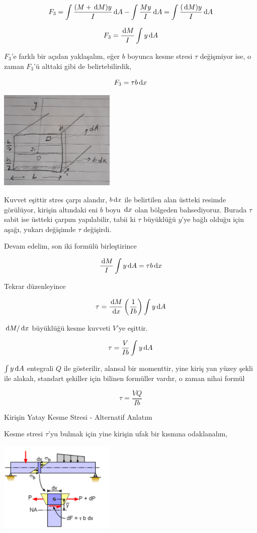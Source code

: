 \documentclass[12pt,fleqn]{article}\usepackage{../../common}
\begin{document}
$$
F_3 = \int \frac{(M + \,\mathrm{d} M)y}{I} \,\mathrm{d} A -  \int \frac{My}{I} \,\mathrm{d} A =
\int \frac{(\,\mathrm{d} M)y}{I} \,\mathrm{d} A
$$

$$
F_3 = \frac{\,\mathrm{d} M}{I} \int y \,\mathrm{d} A
$$

$F_3$'e farklı bir açıdan yaklaşalım, eğer $b$ boyunca kesme stresi $\tau$
değişmiyor ise, o zaman $F_3$'ü alttaki gibi de belirtebilirdik,

$$
F_3 = \tau b \,\mathrm{d} x
$$

\includegraphics[width=15em]{phy_020_strs_02_05.jpg}

Kuvvet eşittir stres çarpı alandır, $b \,\mathrm{d} x$ ile belirtilen alan üstteki
resimde görülüyor, kirişin altındaki eni $b$ boyu $\,\mathrm{d} x$ olan bölgeden
bahsediyoruz. Burada $\tau$ sabit ise üstteki çarpım yapılabilir, tabii ki
$\tau$ büyüklüğü $y$'ye bağlı olduğu için aşağı, yukarı değişimde $\tau$
değişirdi.

Devam edelim, son iki formülü birleştirince

$$
\frac{\,\mathrm{d} M}{I} \int y \,\mathrm{d} A = \tau b \,\mathrm{d} x
$$

Tekrar düzenleyince

$$
\tau = \frac{\,\mathrm{d} M}{\,\mathrm{d} x} \left( \frac{1}{Ib}  \right) \int y \,\mathrm{d} A
$$

$\,\mathrm{d} M / \,\mathrm{d} x$ büyüklüğü kesme kuvveti $V$'ye eşittir. 

$$
\tau =  \frac{V}{Ib} \int y \,\mathrm{d} A
$$

$\int y \,\mathrm{d} A$ entegrali $Q$ ile gösterilir, alansal bir momenttir, yine kiriş
yan yüzey şekli ile alakalı, standart şekiller için bilinen formüller vardır, o
zaman nihai formül

$$
\tau =  \frac{VQ}{Ib}
$$

Kirişin Yatay Kesme Stresi - Alternatif Anlatım

Kesme stresi $\tau$'yu bulmak için yine kirişin ufak bir kısmına odaklanalım,

\includegraphics[width=15em]{phy_020_strs_02_09.jpg}
\end{document}
